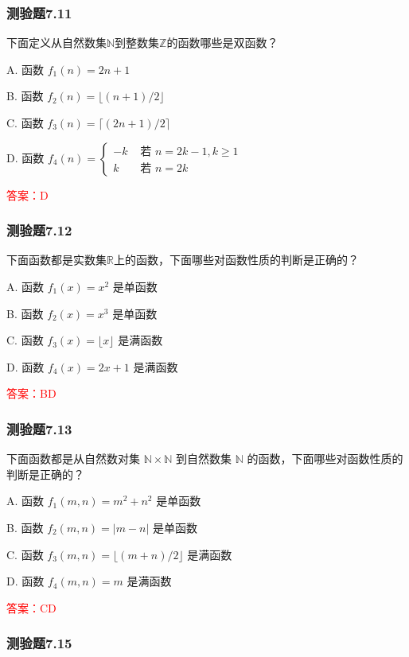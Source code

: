 \documentclass[UTF8, heading=true]{ctexart}
\begin{document}
\subsubsection{测验题7.11}

下面定义从自然数集$\mathbb{N}$到整数集$\mathbb{Z}$的函数哪些是双函数？

A. 函数 $f_1(n)=2 n+1$

B. 函数 $f_2(n)=\lfloor(n+1) / 2\rfloor$

C. 函数 $f_3(n)=\lceil(2 n+1) / 2\rceil$

D. 函数 $f_4(n)= \begin{cases}-k & \text { 若 } n=2 k-1, k \geq 1 \\ k & \text { 若 } n=2 k\end{cases}$

\textcolor{red}{答案：D}

\subsubsection{测验题7.12}

下面函数都是实数集$\mathbb{R}$上的函数，下面哪些对函数性质的判断是正确的？

A. 函数 $f_1(x)=x^2$ 是单函数

B. 函数 $f_2(x)=x^3$ 是单函数

C. 函数 $f_3(x)=\lfloor x\rfloor$ 是满函数

D. 函数 $f_4(x)=2 x+1$ 是满函数

\textcolor{red}{答案：BD}

\subsubsection{测验题7.13}

下面函数都是从自然数对集 $\mathbb{N} \times \mathbb{N}$ 到自然数集 $\mathbb{N}$ 的函数，下面哪些对函数性质的判断是正确的？

A. 函数 $f_1(m, n)=m^2+n^2$ 是单函数

B. 函数 $f_2(m, n)=|m-n|$ 是单函数

C. 函数 $f_3(m, n)=\lfloor(m+n) / 2\rfloor$ 是满函数

D. 函数 $f_4(m, n)=m$ 是满函数

\textcolor{red}{答案：CD}

\subsubsection{测验题7.15}
\end{document}
